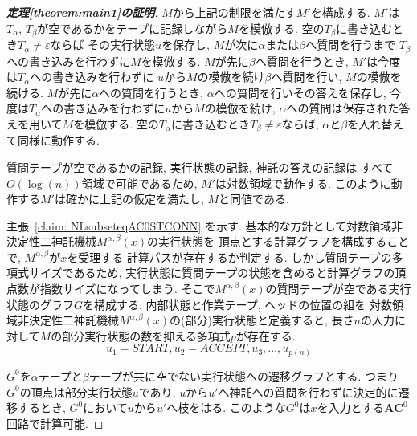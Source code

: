 \documentclass[11pt,a4paper]{jsarticle}
\theoremstyle{definition}
\theoremstyle{remark}
\newcommand{\classfont}{\mathbf}
\newcommand{\AC}{\classfont{AC}}
\newcommand{\emptystring}{\varepsilon}
\begin{document}
\begin{proof}[\bf 定理\ref{theorem:main1}の証明]
$M$から上記の制限を満たす$M'$を構成する.
$M'$は$T_\alpha$, $T_\beta$が空であるかをテープに記録しながら$M$を模倣する.
空の$T_\beta$に書き込むとき$T_\alpha \not = \emptystring$ならば
その実行状態$u$を保存し, $M$が次に$\alpha$または$\beta$へ質問を行うまで
$T_\beta$への書き込みを行わずに$M$を模倣する.
$M$が先に$\beta$へ質問を行うとき, $M'$は今度は$T_\alpha$への書き込みを行わずに
$u$から$M$の模倣を続け$\beta$へ質問を行い, $M$の模倣を続ける.
$M$が先に$\alpha$への質問を行うとき, $\alpha$への質問を行いその答えを保存し,
今度は$T_\alpha$への書き込みを行わずに$u$から$M$の模倣を続け,
$\alpha$への質問は保存された答えを用いて$M$を模倣する.
空の$T_\alpha$に書き込むとき$T_\beta \not = \emptystring$ならば,
$\alpha$と$\beta$を入れ替えて同様に動作する.

質問テープが空であるかの記録, 実行状態の記録, 神託の答えの記録は
すべて$O(\log(n))$領域で可能であるため, $M'$は対数領域で動作する.
このように動作する$M'$は確かに上記の仮定を満たし, $M$と同値である.

\newcommand{\start}{\mathit{START}}
\newcommand{\accept}{\mathit{ACCEPT}}
主張~\ref{claim: NLsubseteqAC0STCONN} を示す.
基本的な方針として対数領域非決定性二神託機械$M^{\alpha, \beta}(x)$の実行状態を
頂点とする計算グラフを構成することで, $M^{\alpha, \beta}$が$x$を受理する
計算パスが存在するか判定する.
しかし質問テープの多項式サイズであるため, 
実行状態に質問テープの状態を含めると計算グラフの頂点数が指数サイズになってしまう.
そこで$M^{\alpha, \beta}(x)$の質問テープが空である実行状態のグラフ$G$を構成する.
内部状態と作業テープ, ヘッドの位置の組を
対数領域非決定性二神託機械$M^{\alpha, \beta}(x)$の(部分)実行状態と定義すると,
長さ$n$の入力に対して$M$の部分実行状態の数を抑える多項式$p$が存在する.
\[
 u_1=\mathit{START}, u_2=\mathit{ACCEPT}, u_3, \dots, u_{p(n)}
\]

$G^0$を$\alpha$テープと$\beta$テープが共に空でない実行状態への遷移グラフとする.
つまり$G^0$の頂点は部分実行状態$u$であり,
$u$から$u'$へ神託への質問を行わずに決定的に遷移するとき,
$G^0$において$u$から$u'$へ枝をはる.
このような$G^0$は$x$を入力とする$\AC^0$回路で計算可能.


\end{proof}
\end{document}
